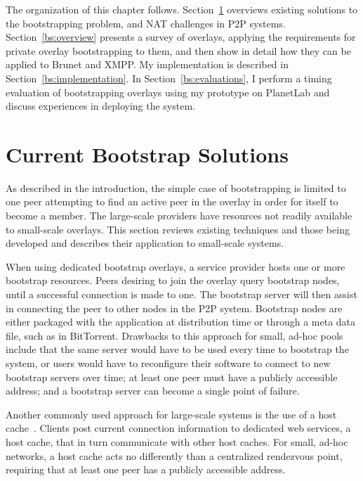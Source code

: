 The organization of this chapter follows.  Section~\ref{bs:background}
overviews existing solutions to the bootstrapping problem, and NAT challenges
in P2P systems.  Section~\ref{bs:overview} presents a survey of overlays,
applying the requirements for private overlay bootstrapping to them, and then
show in detail how they can be applied to Brunet and XMPP.  My implementation
is described in Section~\ref{bs:implementation}.  In
Section~\ref{bs:evaluations}, I perform a timing evaluation of bootstrapping
overlays using my prototype on PlanetLab and discuss experiences in deploying
the system.  

\section{Current Bootstrap Solutions}
\label{bs:background}

As described in the introduction, the simple case of bootstrapping is limited
to one peer attempting to find an active peer in the overlay in order for
itself to become a member.  The large-scale providers have resources not
readily available to small-scale overlays.  This section reviews existing
techniques and those being developed and describes their application to
small-scale systems.

When using dedicated bootstrap overlays, a service provider hosts one or more
bootstrap resources.  Peers desiring to join the overlay query bootstrap nodes,
until a successful connection is made to one.  The bootstrap server will then
assist in connecting the peer to other nodes in the P2P system.  Bootstrap
nodes are either packaged with the application at distribution time or through
a meta data file, such as in BitTorrent.  Drawbacks to this approach for small,
ad-hoc pools include that the same server would have to be used every time to
bootstrap the system, or users would have to reconfigure their software to
connect to new bootstrap servers over time; at least one peer must have a
publicly accessible address; and a bootstrap server can become a single point
of failure.

Another commonly used approach for large-scale systems is the use of a host
cache~\cite{host_cache}.  Clients post current connection information to
dedicated web services, a host cache, that in turn communicate with other host
caches.  For small, ad-hoc networks, a host cache acts no differently than a
centralized rendezvous point, requiring that at least one peer has a publicly
accessible address.

